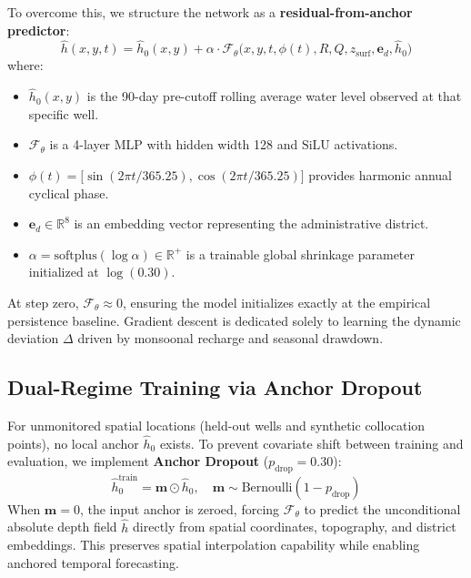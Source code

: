 \documentclass[10pt,conference,letterpaper]{IEEEtran}
\begin{document}
To overcome this, we structure the network as a \textbf{residual-from-anchor predictor}:
\begin{equation}
\hat{h}(x, y, t) = \hat{h}_0(x, y) + \alpha \cdot \mathcal{F}_\theta\big(x, y, t, \phi(t), R, Q, z_{\text{surf}}, \mathbf{e}_d, \hat{h}_0\big)
\label{eq:arch_forward}
\end{equation}
where:
\begin{itemize}
    \item $\hat{h}_0(x, y)$ is the 90-day pre-cutoff rolling average water level observed at that specific well.
    \item $\mathcal{F}_\theta$ is a 4-layer MLP with hidden width 128 and $\text{SiLU}$ activations.
    \item $\phi(t) = \big[\sin(2\pi t / 365.25), \cos(2\pi t / 365.25)\big]$ provides harmonic annual cyclical phase.
    \item $\mathbf{e}_d \in \mathbb{R}^8$ is an embedding vector representing the administrative district.
    \item $\alpha = \text{softplus}(\log \alpha) \in \mathbb{R}^+$ is a trainable global shrinkage parameter initialized at $\log(0.30)$.
\end{itemize}

At step zero, $\mathcal{F}_\theta \approx 0$, ensuring the model initializes exactly at the empirical persistence baseline. Gradient descent is dedicated solely to learning the dynamic deviation $\Delta$ driven by monsoonal recharge and seasonal drawdown.

\subsection{Dual-Regime Training via Anchor Dropout}
For unmonitored spatial locations (held-out wells and synthetic collocation points), no local anchor $\hat{h}_0$ exists. To prevent covariate shift between training and evaluation, we implement \textbf{Anchor Dropout} ($p_{\text{drop}} = 0.30$):
\begin{equation}
\hat{h}_0^{\text{train}} = \mathbf{m} \odot \hat{h}_0, \quad \mathbf{m} \sim \text{Bernoulli}(1 - p_{\text{drop}})
\end{equation}
When $\mathbf{m} = 0$, the input anchor is zeroed, forcing $\mathcal{F}_\theta$ to predict the unconditional absolute depth field $\hat{h}$ directly from spatial coordinates, topography, and district embeddings. This preserves spatial interpolation capability while enabling anchored temporal forecasting.
\end{document}
